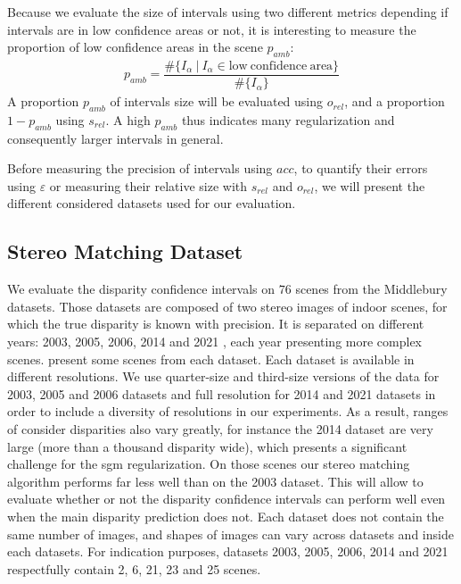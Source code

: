 Because we evaluate the size of intervals using two different metrics depending if intervals are in low confidence areas or not, it is interesting to measure the proportion of low confidence areas in the scene $p_{amb}$:
\begin{align}
    p_{amb} = \dfrac{\#\{I_\alpha ~|~I_\alpha\in\mathrm{low~confidence~area}\}}{\#\{I_\alpha\}}
\end{align}
A proportion $p_{amb}$ of intervals size will be evaluated using $o_{rel}$, and a proportion $1-p_{amb}$ using $s_{rel}$. A high $p_{amb}$ thus indicates many regularization and consequently larger intervals in general.

Before measuring the precision of intervals using $acc$, to quantify their errors using $\varepsilon$ or measuring their relative size with $s_{rel}$ and $o_{rel}$, we will present the different considered datasets used for our evaluation.

\subsection{Stereo Matching Dataset}\label{sec:dataset}
We evaluate the disparity confidence intervals on $76$ scenes from the Middlebury datasets. Those datasets are composed of two stereo images of indoor scenes, for which the true disparity is known with precision. It is separated on different years: 2003, 2005, 2006, 2014 and 2021 \cite{scharstein_high-accuracy_2003, scharstein_learning_2007, hirschmuller_evaluation_2007, scharstein_high-resolution_2014}, each year presenting more complex scenes.  present some scenes from each dataset.  Each dataset is available in different resolutions. We use quarter-size and third-size versions of the data for 2003, 2005 and 2006 datasets and full resolution for 2014 and 2021 datasets in order to include a diversity of resolutions in our experiments. As a result, ranges of consider disparities also vary greatly, for instance the 2014 dataset are very large (more than a thousand disparity wide), which presents a significant challenge for the \acrshort{sgm} regularization. On those scenes our stereo matching algorithm performs far less well than on the 2003 dataset. This will allow to evaluate whether or not the disparity confidence intervals can perform well even when the main disparity prediction does not. Each dataset does not contain the same number of images, and shapes of images can vary across datasets and inside each datasets. For indication purposes, datasets 2003, 2005, 2006, 2014 and 2021 respectfully contain 2, 6, 21, 23 and 25 scenes.

